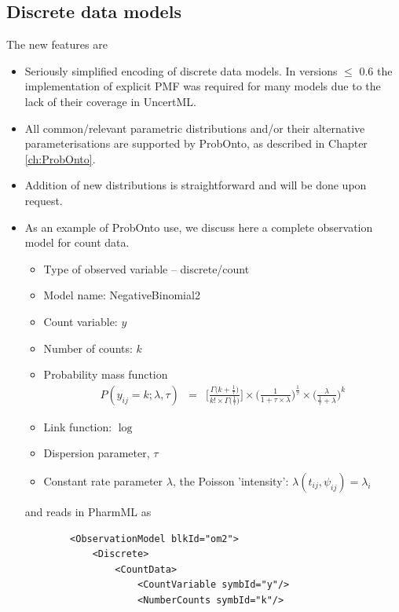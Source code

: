\subsection{Discrete data models}
The new features are 
\begin{itemize}
\item
Seriously simplified encoding of discrete data models. In \pml versions $\leq$ 0.6 
the implementation of explicit PMF was required for many models due to the lack of 
their coverage in UncertML.
\item
All common/relevant parametric distributions and/or their alternative parameterisations 
are supported by ProbOnto, as described in Chapter \ref{ch:ProbOnto}.
\item
Addition of new distributions is straightforward and will be done upon request.
\item
As an example of ProbOnto use, we discuss here a complete observation model for count data.
\begin{itemize}
\item
Type of observed variable -- discrete/count
\item
Model name: NegativeBinomial2
\item
Count variable: $y$
\item
Number of counts: $k$
\item
Probability mass function
\begin{eqnarray}
P(y_{ij} = k; \lambda, \tau) &=& \Bigg[ \frac{\Gamma \big( k + \frac{1}{\tau} \big)}{k! \times \Gamma \big(\frac{1}{\tau} \big)} \Bigg] \times \Bigg( \frac{1}{1 + \tau \times \lambda} \Bigg)^{\frac{1}{\tau}} \times \Bigg(\frac{\lambda}{\frac{1}{\tau} + \lambda} \Bigg)^k \nonumber
\end{eqnarray}
\item
Link function: $\log$
\item
Dispersion parameter, $\tau$
\item
Constant rate parameter $\lambda$, the Poisson 'intensity': $\lambda(t_{ij}, \psi_{ij}) = \lambda_{i}$
\end{itemize}
and reads in PharmML as
\lstset{language=XML}
\begin{lstlisting}
        <ObservationModel blkId="om2">
            <Discrete>
                <CountData>
                    <CountVariable symbId="y"/>
                    <NumberCounts symbId="k"/>
                    

\end{lstlisting}
\end{itemize}
